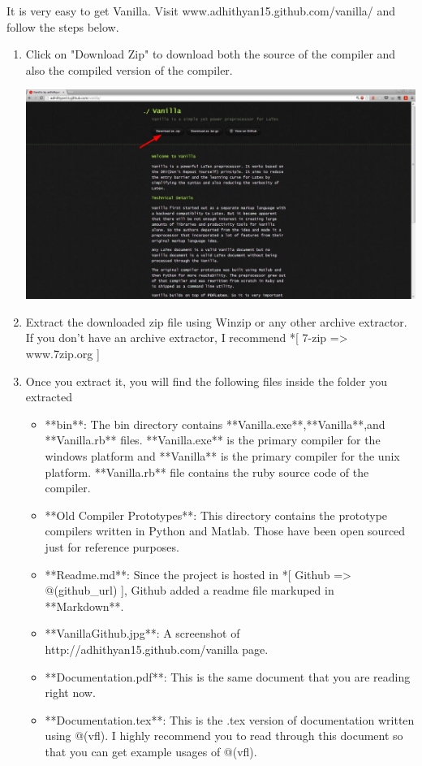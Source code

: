 \documentclass{article}
\begin{document}
It is very easy to get Vanilla. Visit www.adhithyan15.github.com/vanilla/ and follow the steps below. 

\begin{enumerate}

\item Click on "Download Zip" to download both the source of the compiler and also the compiled version of the compiler. \vspace{5pt}

\includegraphics[scale = 0.35]{VanillaGithub}

\item Extract the downloaded zip file using Winzip or any other archive extractor. If you don't have an archive extractor, I recommend *[ 7-zip => www.7zip.org ]

\item Once you extract it, you will find the following files inside the folder you extracted

\begin{itemize}

\item **bin**: The bin directory contains **Vanilla.exe**,**Vanilla**,and **Vanilla.rb** files. **Vanilla.exe** is the primary compiler for the windows platform and **Vanilla** is the primary compiler for the unix platform. **Vanilla.rb** file contains the ruby source code of the compiler. 
\item **Old Compiler Prototypes**: This directory contains the prototype compilers written in Python and Matlab. Those have been open sourced just for reference purposes. 
\item **Readme.md**: Since the project is hosted in *[ Github => @(github_url) ], Github added a readme file markuped in **Markdown**.
\item **VanillaGithub.jpg**: A screenshot of http://adhithyan15.github.com/vanilla page. 
\item **Documentation.pdf**: This is the same document that you are reading right now. 
\item **Documentation.tex**: This is the .tex version of documentation written using @(vfl). I highly recommend you to read through this document so that you can get example usages of @(vfl). 


\end{itemize}
\end{enumerate}
\end{document}

